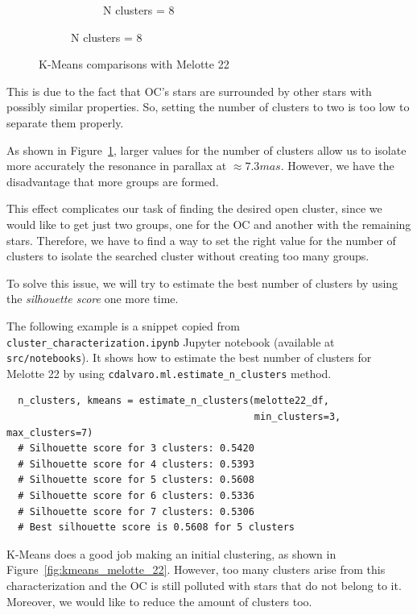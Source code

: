 \documentclass[11pt, a4paper, english]{book}
\begin{document}
\begin{figure}[htbp]
\begin{subfigure}{0.9\textwidth}
\begin{subfigure}[t]{0.3\textwidth}
      \caption{N clusters = 8}
    \end{subfigure}
  \end{subfigure}
  \caption{K-Means comparisons with Melotte 22}
  \label{fig:kmeans_comparisons_melotte_22}
\end{figure}

This is due to the fact that OC's stars are surrounded by other stars with possibly similar properties.
So, setting the number of clusters to two is too low to separate them properly.

As shown in Figure~\ref{fig:kmeans_comparisons_melotte_22},
larger values for the number of clusters allow us to isolate more accurately the resonance in parallax
at \(\approx 7.3mas\). However, we have the disadvantage that more groups are formed.

This effect complicates our task of finding the desired open cluster,
since we would like to get just two groups, one for the OC and another with the remaining stars.
Therefore, we have to find a way to set the right value for the number of clusters
to isolate the searched cluster without creating too many groups.

To solve this issue, we will try to estimate the best number of clusters by using the \emph{silhouette score} one more time.

The following example is a snippet copied from \verb|cluster_characterization.ipynb|
Jupyter notebook (available at \verb|src/notebooks|).
It shows how to estimate the best number of clusters for Melotte 22 by using \verb|cdalvaro.ml.estimate_n_clusters| method.

\begin{verbatim}
  n_clusters, kmeans = estimate_n_clusters(melotte22_df,
                                           min_clusters=3, max_clusters=7)
  # Silhouette score for 3 clusters: 0.5420
  # Silhouette score for 4 clusters: 0.5393
  # Silhouette score for 5 clusters: 0.5608
  # Silhouette score for 6 clusters: 0.5336
  # Silhouette score for 7 clusters: 0.5306
  # Best silhouette score is 0.5608 for 5 clusters
\end{verbatim}

K-Means does a good job making an initial clustering,
as shown in Figure~\ref{fig:kmeans_melotte_22}.
However, too many clusters arise from this characterization
and the OC is still polluted with stars that do not belong to it.
Moreover, we would like to reduce the amount of clusters too.
\end{document}
